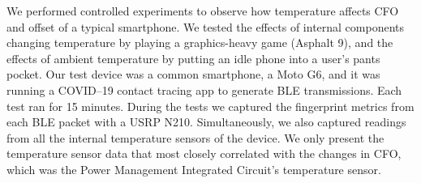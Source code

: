 We performed controlled experiments to observe how temperature affects CFO and \iq offset of a typical smartphone. We tested the effects of internal components changing temperature by playing a
graphics-heavy game (Asphalt 9), and the effects of ambient temperature by putting an idle phone into a user's pants
pocket.
%
Our test device was a common smartphone, a Moto G6, and it was running a COVID--19 contact tracing app to generate BLE transmissions.
%
Each test ran for 15 minutes. During the tests we captured the fingerprint metrics from each BLE packet with a USRP N210.
%
Simultaneously, we also captured readings from all the internal temperature sensors of the device.
We only present the temperature sensor data that most closely correlated with the changes in
CFO, which was the Power Management Integrated Circuit's temperature sensor.

